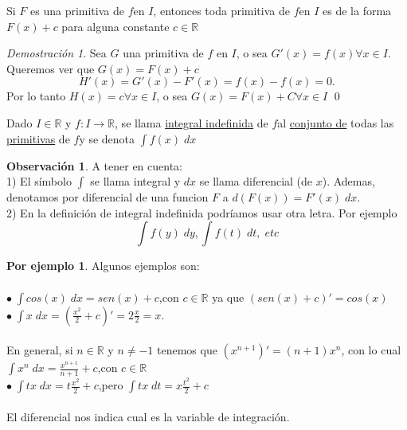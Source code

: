 \documentclass{article}
\theoremstyle{definition}
\newtheorem*{obs}{Observación}
\newtheorem*{ej}{Por ejemplo}
\theoremstyle{remark}
\newtheorem*{demo}{Demostración}
\newcommand\R{\ensuremath{\mathbb{R}}}
\newcommand\fun{$f$\;}
\newcommand\I{$I$\;}
\newcommand\e{$\in$\:}
\newcommand\bl{$\bullet\;$}
\begin{document}
\begin{teo}
Si $F$  es una primitiva de \fun en $I$, entonces toda primitiva de \fun en $I$ es de la forma $F(x)+c$ para alguna constante $c \in \R $
\end{teo}

\begin{demo}
Sea $G$ una primitiva de $f$ en $I$, o sea $G'(x)=f(x)$\quad$\forall x \in I$. \\
Queremos ver que $G(x)=F(x)+c$
$$H'(x)=G'(x)-F'(x)=f(x)-f(x)=0.$$
Por lo tanto $H(x)=c$\quad$\forall x \in I$, o sea $G(x)=F(x)+C$\quad $\forall x \in I$ \qed
\end{demo}
\pagebreak
\begin{defi}
  Dado \I \e \R \; y $f : I \to \R $, se llama \underline{integral indefinida} de \fun al \underline{conjunto de} todas las \underline{primitivas} de \fun y se denota $\int{f(x)\;dx}$
\end{defi}

\begin{obs}
A tener en cuenta: \\
1) El símbolo $\int$ se llama integral y $dx$ se llama diferencial (de $x$).
Ademas, denotamos por diferencial de una funcion $F$ a $d(F(x))=F'(x)\;dx$.\\
2) En la definición de integral indefinida podríamos usar otra letra. Por ejemplo $$\int{f(y)\;dy},\int{f(t)\;dt,\;etc}$$
\end{obs}

\begin{ej}
Algunos ejemplos son: \; \\\\
\bl $\int{cos(x)\;dx=sen(x)+c}$,\quad con $c\in\R$ ya que $(sen(x)+c)'=cos(x)$ \\

\bl $\int{x}\;dx=(\frac{x^2}{2}+c)'=2\frac{x}{2}=x$.\\\\
En general, si $n\in\R$ y $n\neq -1$ tenemos que $(x^{n+1})'=(n+1)x^n$, con lo cual \\
$\int{x^n\;dx}=\frac{x^{n+1}}{n+1}+c$,\quad con $c\in\R$\\

\bl $\int{tx\;dx}=t\frac{x^2}{2}+c$,\quad pero $\int{tx\;dt}=x\frac{t^2}{2}+c$\\\\
El diferencial nos indica cual es la variable de integración.
\end{ej}
\end{document}
